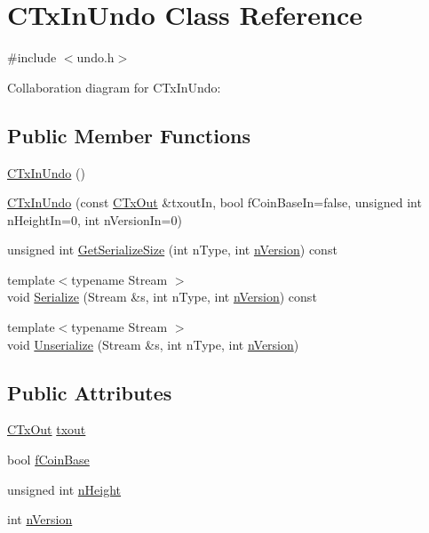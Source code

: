 \hypertarget{class_c_tx_in_undo}{}\section{C\+Tx\+In\+Undo Class Reference}
\label{class_c_tx_in_undo}


{\ttfamily \#include $<$undo.\+h$>$}



Collaboration diagram for C\+Tx\+In\+Undo\+:
\subsection*{Public Member Functions}
\begin{DoxyCompactItemize}
\item 
\hyperlink{class_c_tx_in_undo_a9f8d4a16f1cb14fcec729becdb944003}{C\+Tx\+In\+Undo} ()
\item 
\hyperlink{class_c_tx_in_undo_a9f4da076d789bf5fa3f6d8d4b1d7d6fd}{C\+Tx\+In\+Undo} (const \hyperlink{class_c_tx_out}{C\+Tx\+Out} \&txout\+In, bool f\+Coin\+Base\+In=false, unsigned int n\+Height\+In=0, int n\+Version\+In=0)
\item 
unsigned int \hyperlink{class_c_tx_in_undo_a6f992d64f9d4ee6299cbd3305e4fd90f}{Get\+Serialize\+Size} (int n\+Type, int \hyperlink{class_c_tx_in_undo_a193281289475ca792e436a7a02de23ef}{n\+Version}) const 
\item 
{\footnotesize template$<$typename Stream $>$ }\\void \hyperlink{class_c_tx_in_undo_a37cebff3e836226b36e51d91e7cc2739}{Serialize} (Stream \&s, int n\+Type, int \hyperlink{class_c_tx_in_undo_a193281289475ca792e436a7a02de23ef}{n\+Version}) const 
\item 
{\footnotesize template$<$typename Stream $>$ }\\void \hyperlink{class_c_tx_in_undo_a0a2b82f03edad7ad85a66e63e4552af9}{Unserialize} (Stream \&s, int n\+Type, int \hyperlink{class_c_tx_in_undo_a193281289475ca792e436a7a02de23ef}{n\+Version})
\end{DoxyCompactItemize}
\subsection*{Public Attributes}
\begin{DoxyCompactItemize}
\item 
\hyperlink{class_c_tx_out}{C\+Tx\+Out} \hyperlink{class_c_tx_in_undo_a0eb1374984b5b68b0af14d88d7d4b821}{txout}
\item 
bool \hyperlink{class_c_tx_in_undo_a5952f917224de3a2193157b856c47864}{f\+Coin\+Base}
\item 
unsigned int \hyperlink{class_c_tx_in_undo_af022118f015a9b1b9ab96e04e8452292}{n\+Height}
\item 
int \hyperlink{class_c_tx_in_undo_a193281289475ca792e436a7a02de23ef}{n\+Version}
\end{DoxyCompactItemize}


